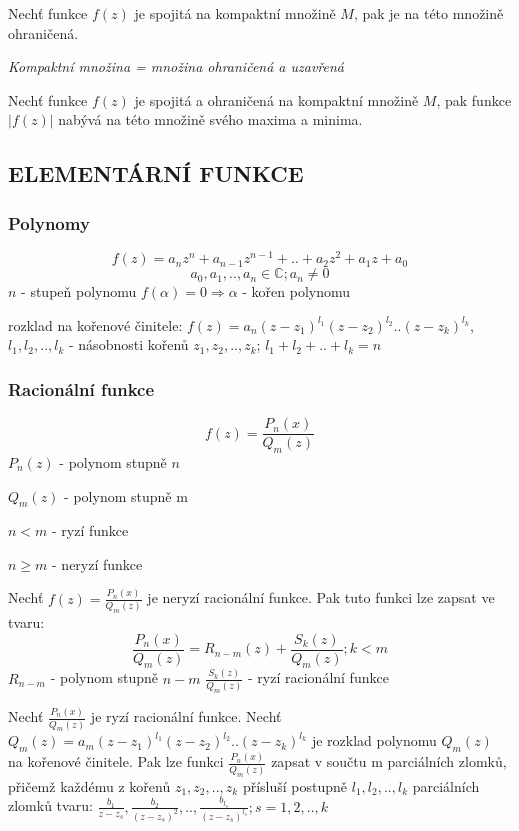 \begin{theorem}[1. Weierstrass]
Nechť funkce $f(z)$ je spojitá na kompaktní množině $M$, pak je na této množině ohraničená.
\end{theorem}

\textit{Kompaktní množina = množina ohraničená a uzavřená}

\begin{theorem}[2. Weierstrass]
Nechť funkce $f(z)$ je spojitá a ohraničená na kompaktní množině $M$, pak funkce $|f(z)|$ nabývá na této množině svého maxima a minima.
\end{theorem}

\subsection{ELEMENTÁRNÍ FUNKCE}

\subsubsection{Polynomy}
$$f(z)=a_nz^n+a_{n-1}z^{n-1}+..+a_2z^2+a_1z+a_0$$
$$a_0,a_1,..,a_n\in\mathbb{C}; a_n\neq0$$
$n$ - stupeň polynomu
$f(\alpha)=0 \Rightarrow \alpha$ - kořen polynomu

rozklad na kořenové činitele: $f(z)=a_n(z-z_1)^{l_1}(z-z_2)^{l_2}..(z-z_k)^{l_k}$, $l_1,l_2,..,l_k$ - násobnosti kořenů $z_1,z_2,..,z_k$; $l_1+l_2+..+l_k=n$

\subsubsection{Racionální funkce}
$$f(z)=\frac{P_n(x)}{Q_m(z)}$$
$P_n(z)$ - polynom stupně $n$

$Q_m(z)$ - polynom stupně m

$n<m$ - ryzí funkce

$n\geq m$ - neryzí funkce

\begin{theorem}
Nechť $f(z)=\frac{P_n(x)}{Q_m(z)}$ je neryzí racionální funkce. Pak tuto funkci lze zapsat ve tvaru: $$\frac{P_n(x)}{Q_m(z)}=R_{n-m}(z)+\frac{S_k(z)}{Q_m(z)}; k<m$$
$R_{n-m}$ - polynom stupně $n-m$
$\frac{S_k(z)}{Q_m(z)}$ - ryzí racionální funkce
\end{theorem}

%

\begin{theorem}
Nechť $\frac{P_n(x)}{Q_m(z)}$ je ryzí racionální funkce. Nechť $Q_m(z)=a_m(z-z_1)^{l_1}(z-z_2)^{l_2}..(z-z_k)^{l_k}$ je rozklad polynomu $Q_m(z)$ na kořenové činitele. Pak lze funkci $\frac{P_n(x)}{Q_m(z)}$ zapsat v součtu m parciálních zlomků, přičemž každému z kořenů $z_1,z_2,..,z_k$ přísluší postupně $l_1,l_2,..,l_k$ parciálních zlomků tvaru: $\frac{b_1}{z-z_s},\frac{b_2}{(z-z_s)^2},..,\frac{b_{l_s}}{(z-z_s)^{l_s}}; s=1,2,..,k$
\end{theorem}

